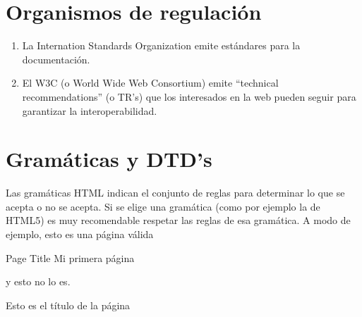 \documentclass[letterpaper,10pt,spanish]{sphinxmanual}
\begin{document}
\section{Organismos de regulación}
\label{\detokenize{tema1:organismos-de-regulacion}}\begin{enumerate}
\item {} 
La Internation Standards Organization emite estándares para la documentación.

\item {} 
El W3C (o World Wide Web Consortium) emite “technical recommendations” (o TR’s) que los interesados en la web pueden seguir para garantizar la interoperabilidad. 

\end{enumerate}


\section{Gramáticas y DTD’s}
\label{\detokenize{tema1:gramaticas-y-dtds}}
Las gramáticas HTML indican el conjunto de reglas para determinar lo que se acepta o no
se acepta. Si se elige una gramática (como por ejemplo la de HTML5) es muy recomendable
respetar las reglas de esa gramática.
A modo de ejemplo, esto es una página válida

\begin{sphinxVerbatim}[commandchars=\\\{\}]
                Page Title
                Mi primera página
\end{sphinxVerbatim}

y esto no lo es.

\begin{sphinxVerbatim}[commandchars=\\\{\}]
        Esto es el título de la página
\end{sphinxVerbatim}
\end{document}
